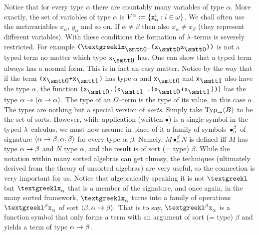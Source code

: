 Notice that for every type $\alpha$ there are countably many 
variables of type $\alpha$. More exactly, the set of variables 
of type $\alpha$ is 
$V^{\alpha} := \{\mbox{\tt x}^i_{\alpha} : i \in \omega\}$.
We shall often use the metavariables $x_{\alpha}$,
$y_{\alpha}$ and so on. If $\alpha \neq \beta$ then also
$x_{\alpha} \neq x_{\beta}$ (they represent different variables).
With these conditions the formation of $\lambda$--terms is severely 
restricted. For example $\mbox{\tt (\stlambda x$_{\snull}$.(x%
$_{\snull}$x$_{\snull}$))}$ is not a typed term no matter which 
type $\mbox{\tt x}_{\snull}$ has. One can show that a typed term 
always has a normal form. This is in fact an easy matter. Notice 
by the way that if the term {\tt (x$_{\snull}$+x$_{\seins}$)} has 
type $\alpha$ and {\tt x$_{\snull}$} and {\tt x$_{\seins}$} also 
have the type $\alpha$, the function 
{\tt ({\stlambda}x$_{\snull}$.({\stlambda}x$_{\seins}$%
.(x$_{\snull}$+x$_{\seins}$)))} has the type $\alpha
\rightarrow (\alpha \rightarrow \alpha)$. The type of an $\Omega$--term is the
type of its value, in this case $\alpha$. The types are nothing
but a special version of {\it sorts}. Simply take 
$\operatorname{Typ}_{\rightarrow}(B)$ to be the set of sorts. However, while 
application (written $\bullet$) is a single symbol in the typed 
$\lambda$--calculus, we must now assume in place of it a family of 
symbols $\bullet^{\beta}_{\alpha}$ of signature $\langle \alpha\rightarrow\beta,
\alpha, \beta\rangle$ for every type $\alpha, \beta$. Namely,
$M \bullet^{\beta}_{\alpha} N$ is defined iff
$M$ has type $\alpha\rightarrow\beta$ and $N$ type $\alpha$, and the
result is of sort (= type) $\beta$. While the notation within many
sorted algebras can get clumsy, the techniques (ultimately derived
from the theory of unsorted algebras) are very useful, so the
connection is very important for us. Notice that algebraically
speaking it is not $\mbox{\tt \stlambda}$ but 
$\mbox{\tt \stlambda x}_{\alpha}$
that is a member of the signature, and once again, in the many
sorted framework, $\mbox{\tt \stlambda x}_{\alpha}$ turns into a
family of operations $\mbox{\tt \tlambda$^{\beta}$x}_{\alpha}$ of
sort $\langle \beta, \alpha\rightarrow\beta\rangle$. That is to say, $\mbox{\tt
\stlambda$^{\beta}$x}_{\alpha}$ is a function symbol that only
forms a term with an argument of sort (= type) $\beta$ and yields
a term of type $\alpha\rightarrow \beta$.

